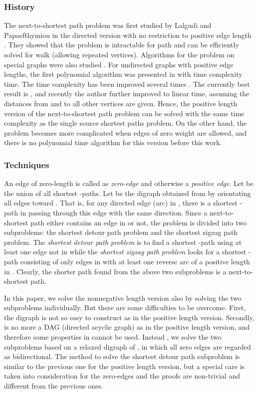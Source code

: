 \documentclass[review]{elsarticle}
\begin{document}
\subsubsection*{History}
The next-to-shortest path problem was first studied by Lalgudi and
Papaefthymiou in the directed version with no restriction to
positive edge length \cite{lal97}. They showed that the problem is
intractable for path and can be efficiently solved for walk
(allowing repeated vertices). Algorithms for the problem on special
graphs were also studied \cite{bar07,mod06}. For undirected graphs
with positive edge lengths, the first polynomial algorithm was
presented in \cite{kra04} with time complexity  time. The
time complexity has been improved several times
\cite{li06,kao11,wu10}. The currently best result is 
\cite{wu10}, and recently the author further improved to linear
time, assuming the distances from  and  to all other vertices
are given. Hence, the positive length version of the
next-to-shortest path problem can be solved with the same time
complexity as the single source shortest paths problem. On the other
hand, the problem becomes more complicated when edges of zero weight
are allowed, and there is no polynomial time algorithm for this
version before this work.

\subsubsection*{Techniques}
An edge of zero-length is called as \emph{zero-edge} and otherwise a
\emph{positive edge}. Let  be the union of all shortest
-paths. Let  be the digraph obtained from  by
orientating all edges toward . That is, for any directed edge
(arc) in , there is a shortest -path in  passing
through this edge with the same direction. Since a next-to-shortest
path either contains an edge in  or not, the problem is
divided into two subproblems: the shortest detour path problem and
the shortest zigzag path problem. The {\em shortest detour path
problem} is to find a shortest -path using at least one edge not
in  while the {\em shortest zigzag path problem} looks for a
shortest -path consisting of only edges in  with at least
one reverse arc of a positive length in . Clearly, the shorter
path found from the above two subproblems is a next-to-shortest
path.

In this paper, we solve the nonnegative length version also by
solving the two subproblems individually. But there are some
difficulties to be overcome. First, the digraph  is not so
easy to construct as in the positive length version. Secondly,
 is no more a DAG (directed acyclic graph) as in the positive
length version, and therefore some properties in \cite{wu10} cannot
be used. Instead , we solve the two subproblems based on a
relaxed digraph  of , in which all zero edges are
regarded as bidirectional. The method to solve the shortest detour
path subproblem is similar to the previous one for the positive
length version, but a special care is taken into consideration for
the zero-edges and the proofs are non-trivial and different from the previous ones.
\end{document}
